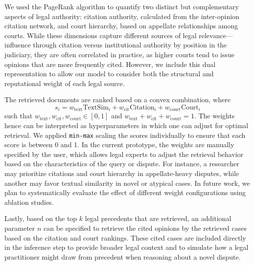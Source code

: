 We used the PageRank algorithm to quantify two distinct but complementary aspects of legal authority: citation authority, calculated from the inter-opinion citation network, and court hierarchy, based on appellate relationships among courts. While these dimensions capture different sources of legal relevance—influence through citation versus institutional authority by position in the judiciary, they are often correlated in practice, as higher courts tend to issue opinions that are more frequently cited. However, we include this dual representation to allow our model to consider both the structural and reputational weight of each legal source.

The retrieved documents are ranked based on a convex combination, where
\begin{equation}
    s_{i} = w_{\text{text}}\text{TextSim}_i + w_{\text{cit}}\text{Citation}_i + w_{\text{court}}\text{Court}_i
\end{equation}
such that $w_{\text{text}}, w_{\text{cit}}, w_{\text{court}} \in [0,1]$ and $w_{\text{text}} + w_{\text{cit}} + w_{\text{court}} = 1$. The weights hence can be interpreted as hyperparameters in which one can adjust for optimal retrieval. We applied \texttt{min-max} scaling the scores individually to ensure that each score is between 0 and 1. In the current prototype, the weights are manually specified by the user, which allows legal experts to adjust the retrieval behavior based on the characteristics of the query or dispute. For instance, a researcher may prioritize citations and court hierarchy in appellate-heavy disputes, while another may favor textual similarity in novel or atypical cases. In future work, we plan to systematically evaluate the effect of different weight configurations using ablation studies.

Lastly, based on the top $k$ legal precedents that are retrieved, an additional parameter $n$ can be specified to retrieve the cited opinions by the retrieved cases based on the citation and court rankings. These cited cases are included directly in the inference step to provide broader legal context and to simulate how a legal practitioner might draw from precedent when reasoning about a novel dispute.

